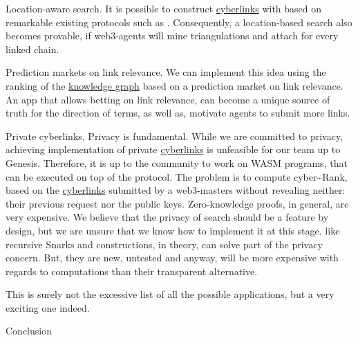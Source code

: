 \documentclass[8pt,oneside]{amsart}
\makeatletter
\newcommand{\linkgreen}[2]{\href{#1}{\color{green}{#2}}}
\renewcommand\subsection{\@startsection{subsection}
                                    {2}{\z@}
                                    {-3.25ex\@plus -1ex \@minus -.2ex}
                                    {0ex \@plus .2ex}
                                    {\play\Large}
                        }
\newcommand{\titleSection}[1]{\subsection{#1}}
\makeatother
\begin{document}
Location-aware search. It is possible to construct {\hyperref[cyberlinks]{cyberlinks}} with \linkgreen{https://ipfs.io/ipfs/QmZYKGuLHf2h1mZrhiP2FzYsjj3tWt2LYduMCRbpgi5pKG}{Proof-of-Location} based on remarkable existing protocols such as \linkgreen{https://ipfs.io/ipfs/QmZYKGuLHf2h1mZrhiP2FzYsjj3tWt2LYduMCRbpgi5pKG}{Foam}. Consequently, a location-based search also becomes provable, if web3-agents will mine triangulations and attach \linkgreen{https://ipfs.io/ipfs/QmZYKGuLHf2h1mZrhiP2FzYsjj3tWt2LYduMCRbpgi5pKG}{proof-of-location} for every linked chain.

Prediction markets on link relevance. We can implement this idea using the ranking of the {\hyperref[knowledge-graph]{knowledge graph}} based on a prediction market on link relevance. An app that allows betting on link relevance, can become a unique source of truth for the direction of terms, as well as, motivate agents to submit more links.

Private cyberlinks. Privacy is fundamental. While we are committed to privacy, achieving implementation of private {\hyperref[cyberlinks]{cyberlinks}} is unfeasible for our team up to Genesis. Therefore, it is up to the community to work on WASM programs, that can be executed on top of the protocol. The problem is to compute cyber\~{}Rank, based on the {\hyperref[cyberlinks]{cyberlinks}} submitted by a web3-masters without revealing neither: their previous request nor the public keys. Zero-knowledge proofs, in general, are very expensive. We believe that the privacy of search should be a feature by design, but we are unsure that we know how to implement it at this stage. \linkgreen{https://ipfs.io/ipfs/Qmdje3AmtsfjX9edWAxo3LFhV9CTAXoUvwGR7wHJXnc2Gk}{Coda} like recursive Snarks and \linkgreen{https://ipfs.io/ipfs/Qmd99xmraYip9cVv8gRMy6Y97Bkij8qUYArGDME7CzFasg}{MimbleWimble} constructions, in theory, can solve part of the privacy concern. But, they are new, untested and anyway, will be more expensive with regards to computations than their transparent alternative.

This is surely not the excessive list of all the possible applications, but a very exciting one indeed.

\titleSection{Conclusion}\label{conclusion}
\end{document}
